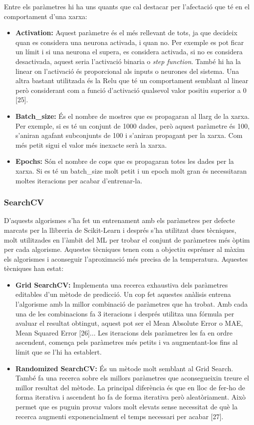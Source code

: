\documentclass[10pt,a4paper,twocolumn,twoside]{article}
\begin{document}
Entre els paràmetres hi ha uns quants que cal destacar per l'afectació que té en el comportament d'una xarxa:
\begin{itemize}
\item \textbf{Activation:} Aquest paràmetre és el més rellevant de tots, ja que decideix quan es considera una neurona activada, i quan no. Per exemple es pot ficar un límit i si una neurona el supera, es considera activada, si no es considera desactivada, aquest seria l'activació binaria o \textit{step function}. També hi ha la linear on l'activació és proporcional als inputs o neurones del sistema. Una altra bastant utilitzada és la Relu que té un comportament semblant al linear però considerant com a funció d'activació qualsevol valor positiu superior a 0 [25].
\item \textbf{Batch\_size:} És el nombre de mostres que es propagaran al llarg de la xarxa. Per exemple, si es té un conjunt de 1000 dades, però aquest paràmetre és 100, s'aniran agafant subconjunts de 100 i s'aniran propagant per la xarxa. Com més petit sigui el valor més inexacte serà la xarxa.
\item \textbf{Epochs:} Són el nombre de cops que es propagaran totes les dades per la xarxa. Si es té un batch\_size molt petit i un epoch molt gran és necessitaran moltes iteracions per acabar d'entrenar-la.
\end{itemize}

\subsubsection{SearchCV}
D'aquests algorismes s'ha fet un entrenament amb els paràmetres per defecte marcats per la llibreria de Scikit-Learn i després s'ha utilitzat dues tècniques, molt utilitzades en l'àmbit del ML per trobar el conjunt de paràmetres més òptim per cada algorisme. Aquestes tècniques tenen com a objectiu esprémer al màxim els algorismes i aconseguir l'aproximació més precisa de la temperatura. Aquestes tècniques han estat:
\begin{itemize}
\item \textbf{Grid SearchCV:} Implementa una recerca exhaustiva dels paràmetres editables d'un mètode de predicció. Un cop fet aquestes anàlisis entrena l'algorisme amb la millor combinació de paràmetres que ha trobat. Amb cada una de les combinacions fa 3 iteracions i després utilitza una fórmula per avaluar el resultat obtingut, aquest pot ser el Mean Absolute Error o MAE, Mean Squared Error [26]... Les iteracions dels paràmetres les fa en ordre ascendent, comença pels paràmetres més petits i va augmentant-los fins al límit que se l'hi ha establert.
\item \textbf{Randomized SearchCV:} És un mètode molt semblant al Grid Search. També fa una recerca sobre els millors paràmetres que aconsegueixin treure el millor resultat del mètode. La principal diferència és que en lloc de fer-ho de forma iterativa i ascendent ho fa de forma iterativa però aleatòriament. Això permet que es puguin provar valors molt elevats sense necessitat de què la recerca augmenti exponencialment el temps necessari per acabar [27].


\end{itemize}
\end{document}
